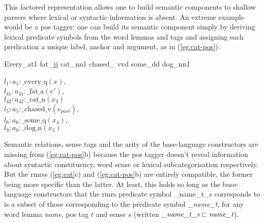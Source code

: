 This factored representation allows one to build semantic components
to shallow parsers where lexical or syntactic information is absent.
An extreme example would be a {\sc 
  pos} tagger: one can build its semantic component simply by deriving
lexical predicate symbols from the word lemmas and tags and assigning each
predication a unique label, anchor and
argument, as in (\ref{eg:cat-pos}):
\begin{examples}
\item   \label{eg:cat-pos}
\begin{subexamples}
\item   Every\_{\sc at1} fat\_{\sc jj} cat\_{\sc nn1} chased\_{\sc
    vvd} some\_{\sc dd} dog\_{\sc nn1}
\item   $l_1:a_1:\mbox{\_every\_q}(x)$, \\
$l_{41}:a_{41}:\mbox{\_fat\_a}(e')$,\\
$l_{42}:a_{42}:\mbox{\_cat\_n}(x_3)$\\
$l_5:a_5:\mbox{\_chased\_v}(e_{past})$, \\
$l_6:a_6:\mbox{\_some\_q}(x_4)$, \\
$l_9:a_9:\mbox{\_dog\_n}(x_5)$
\end{subexamples}
\end{examples}

Semantic relations, sense tags and the arity of the base-language
constructors are
missing from (\ref{eg:cat-pos}b) because the {\sc pos} tagger doesn't
reveal information about syntactic constituency, word sense or lexical
subcategorisation respectively.  
But the {\sc rmrs}s (\ref{eg:cat}c) and
(\ref{eg:cat-pos}b) are entirely compatible, the former being more
specific than the latter.  At least, this holds so long as the
base-language constructors that the {\sc rmrs} predicate symbol
{\_name\_t\_s} corresponds to is a 
subset of those corresponding to the predicate symbol {\em \_name\_t},
for any word lemma {\em name}, {\sc pos} tag $t$ and sense $s$ (written 
$\mbox{{\em \_name\_t\_s}} \sqsubset \mbox{{\em name\_t}}$). 

